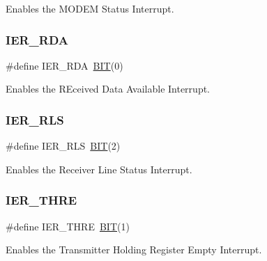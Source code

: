 Enables the M\+O\+D\+EM Status Interrupt. 

\hypertarget{group___serial_gacc2bd3737c0687e576384afc1a37a0cc}{}\label{group___serial_gacc2bd3737c0687e576384afc1a37a0cc} 
\subsubsection{\texorpdfstring{I\+E\+R\+\_\+\+R\+DA}{IER\_RDA}}
{\footnotesize\ttfamily \#define I\+E\+R\+\_\+\+R\+DA~\hyperlink{group___serial_ga3a8ea58898cb58fc96013383d39f482c}{B\+IT}(0)}



Enables the R\+Eceived Data Available Interrupt. 

\hypertarget{group___serial_gaec947c63128590c8f615862ee9c2c953}{}\label{group___serial_gaec947c63128590c8f615862ee9c2c953} 
\subsubsection{\texorpdfstring{I\+E\+R\+\_\+\+R\+LS}{IER\_RLS}}
{\footnotesize\ttfamily \#define I\+E\+R\+\_\+\+R\+LS~\hyperlink{group___serial_ga3a8ea58898cb58fc96013383d39f482c}{B\+IT}(2)}



Enables the Receiver Line Status Interrupt. 

\hypertarget{group___serial_ga22682c3d4571d7a79ed0ca2bc88a15a6}{}\label{group___serial_ga22682c3d4571d7a79ed0ca2bc88a15a6} 
\subsubsection{\texorpdfstring{I\+E\+R\+\_\+\+T\+H\+RE}{IER\_THRE}}
{\footnotesize\ttfamily \#define I\+E\+R\+\_\+\+T\+H\+RE~\hyperlink{group___serial_ga3a8ea58898cb58fc96013383d39f482c}{B\+IT}(1)}



Enables the Transmitter Holding Register Empty Interrupt. 

\hypertarget{group___serial_ga67004975983f9c99226d63db17ba74c4}{}\label{group___serial_ga67004975983f9c99226d63db17ba74c4} 
